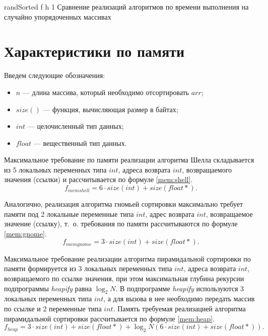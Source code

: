{randSorted} %
{f} %
{h} %
{1\textwidth} %
{Сравнение реализаций алгоритмов по времени выполнения на случайно упорядоченных массивах} %

\clearpage


\section{Характеристики по памяти}

Введем следующие обозначения:
\begin{itemize}
	\item $n$ --- длина массива, который необходимо отсортировать $arr$;
	\item $size()$ --- функция, вычисляющая размер в байтах;
	\item $int$ --- целочисленный тип данных;
	\item $float$ --- вещественный тип данных.
\end{itemize}

Максимальное требование по памяти реализации алгоритма Шелла складывается из 5 локальных переменных типа $int$, адреса возврата $int$, возвращаемого значения (ссылки) и рассчитывается по формуле \eqref{mem:shell}.
\begin{equation}
	\label{mem:shell}
	f_{memshell} = 6 \cdot size(int) + size(float *).
\end{equation}

Аналогично, реализация алгоритма гномьей сортировки максимально требует памяти под 2 локальные переменные типа $int$, адрес возврата $int$, возвращаемое значение (ссылку), т.~о. требования по памяти рассчитываются по формуле \eqref{mem:gnome}.
\begin{equation}
	\label{mem:gnome}
	f_{memgnome} = 3 \cdot size(int) + size(float *).
\end{equation}

Максимальное требование реализации алгоритма пирамидальной сортировки по памяти формируется из 3 локальных переменных типа $int$, адреса возврата $int$, возвращаемого по ссылке значения, при этом максимальная глубина рекурсии подпрограммы \textit{heapify} равна $\log_2 N$. В подпрограмме \textit{heapify} используются 3 локальных переменных типа $int$, а для вызова в нее необходимо передать массив по ссылке и 2 переменные типа $int$. Память требуемая реализацией алгоритма пирамидальной сортировки рассчитывается по формуле \eqref{mem:heap}.
\begin{equation}
	\label{mem:heap}
	f_{heap} = 3 \cdot size(int) + size(float *) + \log_2 N (6 \cdot size(int) + size(float *)).
\end{equation}

